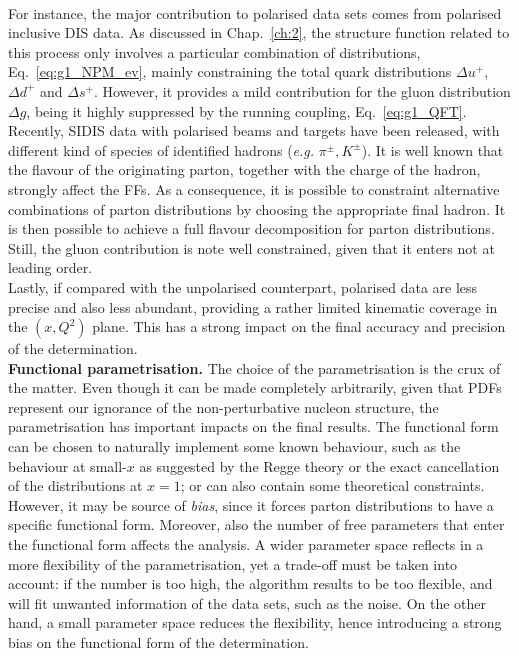 \\[6pt]
For instance, the major contribution to polarised data sets comes from polarised inclusive DIS data. As discussed in Chap.~\ref{ch:2}, the structure function related to this process only involves a particular combination of distributions, Eq.~\ref{eq:g1_NPM_ev}, mainly constraining the total quark distributions $\Delta u^{+}$, $\Delta d^{+}$ and $\Delta s^{+}$. However, it provides a mild contribution for the gluon distribution $\Delta g$, being it highly suppressed by the running coupling, Eq.~\eqref{eq:g1_QFT}.
\\[6pt]
Recently, SIDIS data with polarised beams and targets have been released, with different kind of species of identified hadrons (\textit{e.g.} $\pi^{\pm},K^{\pm}$). It is well known that the flavour of the originating parton, together with the charge of the hadron, strongly affect the FFs. As a consequence, it is possible to constraint alternative combinations of parton distributions by choosing the appropriate final hadron. It is then possible to achieve a full flavour decomposition for parton distributions. Still, the gluon contribution is note well constrained, given that it enters not at leading order.
\\[6pt]
Lastly, if compared with the unpolarised counterpart, polarised data are less precise and also less abundant, providing a rather limited kinematic coverage in the $(x,Q^2)$ plane. This has a strong impact on the final accuracy and precision of the determination.
\endgroup
\\[10pt]
\begingroup
\textbf{Functional parametrisation.} The choice of the parametrisation is the crux of the matter. Even though it can be made completely arbitrarily, given that PDFs represent our ignorance of the non-perturbative nucleon structure, the parametrisation has important impacts on the final results. The functional form can be chosen to naturally implement some known behaviour, such as the behaviour at small-$x$ as suggested by the Regge theory
or the exact cancellation of the distributions at $x=1$; or can also contain some theoretical constraints. However, it may be source of \textit{bias}, since it forces parton distributions to have a specific functional form. Moreover, also the number of free parameters that enter the functional form affects the analysis. A wider parameter space reflects in a more flexibility of the parametrisation, yet a trade-off must be taken into account: if the number is too high, the algorithm results to be too flexible, and will fit unwanted information of the data sets, such as the noise. On the other hand, a small parameter space reduces the flexibility, hence introducing a strong bias on the functional form of the determination.
